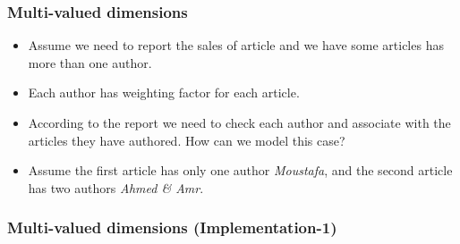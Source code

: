 \begin{frame}
	\frametitle{Multi-valued dimensions}
	\begin{example}
		\begin{itemize}[<+->]
			\item Assume we need to report the sales of article and we have some articles has more than one author.
			\item Each author has weighting factor for each article.
			\item According to the report we need to check each author and associate with the articles they have authored. How can we model this case?
			\item Assume the first article has only one author \textit{Moustafa}, and the second article has two authors \textit{Ahmed \& Amr}.
		\end{itemize}
	\end{example}

\begin{table}
	\caption{author and articles sample data.}
\end{table}

\end{frame}
\begin{frame}
\frametitle{Multi-valued dimensions (Implementation-1)}


\end{frame}
